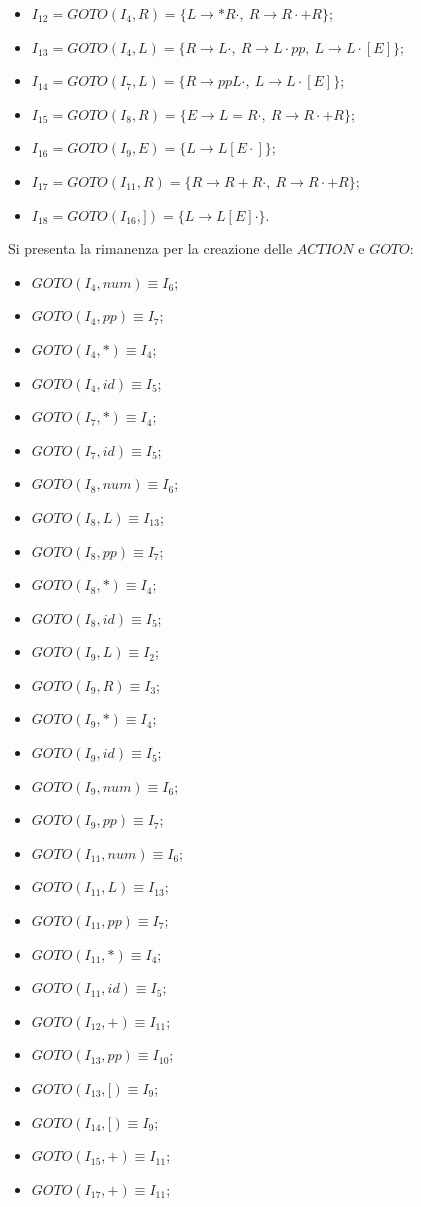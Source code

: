 \documentclass[a4paper,italian]{article}
\begin{document}
\begin{itemize}
	\item $I_{12}=GOTO(I_{4},R)=\{L \rightarrow * R\cdot ,\ R \rightarrow R\cdot + R\}$;
	\item $I_{13}=GOTO(I_{4},L)=\{R \rightarrow L\cdot ,\ R \rightarrow L\cdot pp,\ L \rightarrow L\cdot [ E ]\}$;
	\item $I_{14}=GOTO(I_{7},L)=\{R \rightarrow pp L\cdot ,\ L \rightarrow L\cdot [ E ]\}$;
	\item $I_{15}=GOTO(I_{8},R)=\{E \rightarrow L = R\cdot ,\ R \rightarrow R\cdot + R\}$;
	\item $I_{16}=GOTO(I_{9},E)=\{L \rightarrow L [ E\cdot ]\}$;
	\item $I_{17}=GOTO(I_{11},R)=\{R \rightarrow R + R\cdot ,\ R \rightarrow R\cdot + R\}$;
	\item $I_{18}=GOTO(I_{16},])=\{L \rightarrow L [ E ]\cdot \}$.
\end{itemize}
Si presenta la rimanenza per la creazione delle $ACTION$ e $GOTO$:
\begin{itemize}
	\item $GOTO(I_{4},num)\equiv I_{6}$;
	\item $GOTO(I_{4},pp)\equiv I_{7}$;
	\item $GOTO(I_{4},*)\equiv I_{4}$;
	\item $GOTO(I_{4},id)\equiv I_{5}$;
	\item $GOTO(I_{7},*)\equiv I_{4}$;
	\item $GOTO(I_{7},id)\equiv I_{5}$;
	\item $GOTO(I_{8},num)\equiv I_{6}$;
	\item $GOTO(I_{8},L)\equiv I_{13}$;
	\item $GOTO(I_{8},pp)\equiv I_{7}$;
	\item $GOTO(I_{8},*)\equiv I_{4}$;
	\item $GOTO(I_{8},id)\equiv I_{5}$;
	\item $GOTO(I_{9},L)\equiv I_{2}$;
	\item $GOTO(I_{9},R)\equiv I_{3}$;
	\item $GOTO(I_{9},*)\equiv I_{4}$;
	\item $GOTO(I_{9},id)\equiv I_{5}$;
	\item $GOTO(I_{9},num)\equiv I_{6}$;
	\item $GOTO(I_{9},pp)\equiv I_{7}$;
	\item $GOTO(I_{11},num)\equiv I_{6}$;
	\item $GOTO(I_{11},L)\equiv I_{13}$;
	\item $GOTO(I_{11},pp)\equiv I_{7}$;
	\item $GOTO(I_{11},*)\equiv I_{4}$;
	\item $GOTO(I_{11},id)\equiv I_{5}$;
	\item $GOTO(I_{12},+)\equiv I_{11}$;
	\item $GOTO(I_{13},pp)\equiv I_{10}$;
	\item $GOTO(I_{13},[)\equiv I_{9}$;
	\item $GOTO(I_{14},[)\equiv I_{9}$;
	\item $GOTO(I_{15},+)\equiv I_{11}$;
	\item $GOTO(I_{17},+)\equiv I_{11}$;
\end{itemize}
\end{document}
